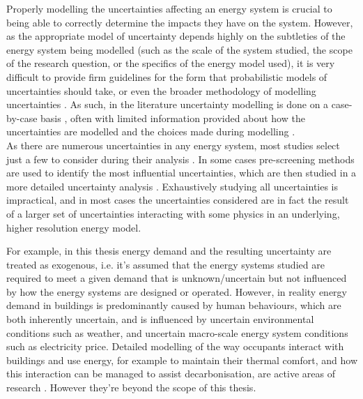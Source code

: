 Properly modelling the uncertainties affecting an energy system is crucial to being able to correctly determine the impacts they have on the system. However, as the appropriate model of uncertainty depends highly on the subtleties of the energy system being modelled (such as the scale of the system studied, the scope of the research question, or the specifics of the energy model used), it is very difficult to provide firm guidelines for the form that probabilistic models of uncertainties should take, or even the broader methodology of modelling uncertainties . As such, in the literature uncertainty modelling is done on a case-by-case basis , often with limited information provided about how the uncertainties are modelled and the choices made during modelling .\\

As there are numerous uncertainties in any energy system, most studies select just a few to consider during their analysis . In some cases pre-screening methods are used to identify the most influential uncertainties, which are then studied in a more detailed uncertainty analysis . Exhaustively studying all uncertainties is impractical, and in most cases the uncertainties considered are in fact the result of a larger set of uncertainties interacting with some physics in an underlying, higher resolution energy model.

For example, in this thesis energy demand and the resulting uncertainty are treated as exogenous, i.e. it's assumed that the energy systems studied are required to meet a given demand that is unknown/uncertain but not influenced by how the energy systems are designed or operated. However, in reality energy demand in buildings is predominantly caused by human behaviours, which are both inherently uncertain, and is influenced by uncertain environmental conditions such as weather, and uncertain macro-scale energy system conditions such as electricity price. Detailed modelling of the way occupants interact with buildings and use energy, for example to maintain their thermal comfort, and how this interaction can be managed to assist decarbonisation, are active areas of research . However they're beyond the scope of this thesis. 


